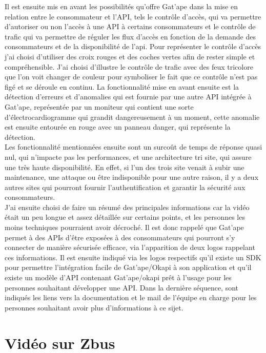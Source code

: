 Il est ensuite mis en avant les possibilités qu'offre Gat'ape dans la mise en relation entre le consommateur et l'API, tels le contrôle d'accès, qui va permettre d'autoriser ou non l'accès à une API à certains consommateurs et le contrôle de trafic qui va permettre de réguler les flux d'accès en fonction de la demande des consommateurs et de la disponibilité de l'api. Pour représenter le contrôle d'accès j'ai choisi d'utiliser des croix rouges et des coches vertes afin de rester simple et compréhensible. J'ai choisi d'illustre le contrôle de trafic avec des feux tricolore que l'on voit changer de couleur pour symboliser le fait que ce contrôle n'est pas figé et se déroule en continu. La fonctionnalité mise en avant ensuite est la détection d'erreurs et d'anomalies qui est fournie par une autre API intégrée à Gat'ape, représentée par un moniteur qui contient une sorte d'électrocardiogramme qui grandit dangereusement à un moment, cette anomalie est ensuite entourée en rouge avec un panneau danger, qui représente la détection.\\
Les fonctionnalité mentionnées ensuite sont un surcoût de temps de réponse quasi nul, qui n'impacte pas les performances, et une architecture tri site, qui assure  une très haute disponibilité. En effet, si l'un des trois site venait à subir une maintenance, une attaque ou être indisponible pour une autre raison, il y a deux autres sites qui pourront fournir l'authentification et garantir la sécurité aux consommateurs.\\

J'ai ensuite choisi de faire un résumé des principales informations car la vidéo était un peu longue et assez détaillée sur certains points, et les personnes les moins techniques pourraient avoir décroché. Il est donc rappelé que Gat'ape permet à des APIs d'être exposées à des consommateurs qui pourront s'y connecter de manière sécurisée efficace, via l'apparition de deux logos rappelant ces informations. Il est ensuite indiqué via les logos respectifs qu'il existe un SDK pour permettre l'intégration facile de Gat'ape/Okapi à son application et qu'il existe un modèle d'API contenant Gat'ape/okapi prêt à l'usage pour les personnes souhaitant développer une API. Dans la dernière séquence, sont indiqués les liens vers la documentation et le mail de l'équipe en charge pour les personnes souhaitant avoir plus d'informations à ce sijet. 



\section{Vidéo sur Zbus}

